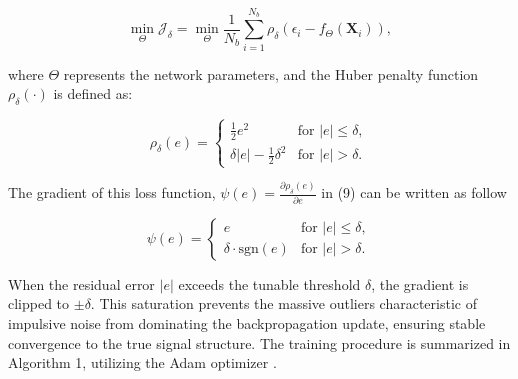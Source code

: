 \documentclass[10pt, journal]{IEEEtran}
\begin{document}
\begin{equation}
\min_{\Theta} \mathcal{J}_{\delta} = \min_{\Theta} \frac{1}{N_b} \sum_{i=1}^{N_b} \rho_{\delta}(\epsilon_i - f_{\Theta}(\mathbf{X}_i)),
\end{equation}

\noindent where $\Theta$ represents the network parameters, and the Huber penalty function $\rho_{\delta}(\cdot)$ is defined as:

\begin{equation}
\rho_{\delta}(e) = \begin{cases} 
\frac{1}{2} e^2 & \text{for } |e| \le \delta, \\
\delta |e| - \frac{1}{2}\delta^2 & \text{for } |e| > \delta.
\end{cases}
\label{eq:huber_loss}
\end{equation}

\noindent The gradient of this loss function, $\psi(e) = \frac{\partial \rho_{\delta}(e)}{\partial e}$ in (9) can be written as follow

\begin{equation}
\psi(e) = \begin{cases} 
e & \text{for } |e| \le \delta, \\
\delta \cdot \text{sgn}(e) & \text{for } |e| > \delta.
\end{cases}
\label{eq:huber_grad}
\end{equation}

When the residual error $|e|$ exceeds the tunable threshold $\delta$, the gradient is clipped to $\pm \delta$. This saturation prevents the massive outliers characteristic of impulsive noise from dominating the backpropagation update, ensuring stable convergence to the true signal structure. The training procedure is summarized in Algorithm 1, utilizing the Adam optimizer \cite{kingma2014adam}.
\end{document}
